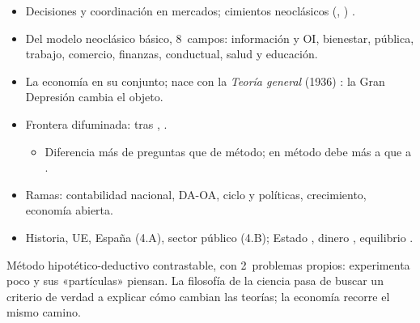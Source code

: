 \documentclass{article}
\begin{document}
\begin{columnas}
\begin{itemize}
\item Decisiones y coordinación en mercados; cimientos neoclásicos (, ) .
\item Del modelo neoclásico básico, 8~campos: información y OI, bienestar, pública, trabajo, comercio, finanzas, conductual, salud y educación.
\end{itemize}
\begin{itemize}
\item La economía en su conjunto; nace con la \emph{Teoría general} (1936) : la Gran Depresión cambia el objeto.
\item Frontera difuminada: tras ,  .
  \begin{itemize}
  \item Diferencia más de preguntas que de método; en método debe más a  que a  .
  \end{itemize}
\item Ramas: contabilidad nacional, DA-OA, ciclo y políticas, crecimiento, economía abierta.
\end{itemize}
\begin{itemize}
\item Historia, UE, España (4.A), sector público (4.B); Estado , dinero , equilibrio .
\end{itemize}

\begin{ideaclave}
Método hipotético-deductivo contrastable, con 2~problemas propios: experimenta poco y sus «partículas» piensan. La filosofía de la ciencia pasa de buscar un criterio de verdad a explicar cómo cambian las teorías; la economía recorre el mismo camino.
\end{ideaclave}


\end{columnas}
\end{document}
